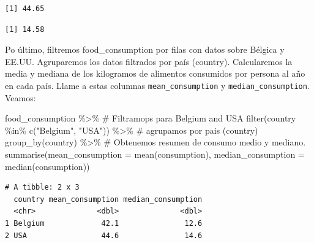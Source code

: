 \documentclass[
  letterpaper,
  DIV=11,
  numbers=noendperiod]{scrreprt}
\newenvironment{Shaded}{\begin{snugshade}}{\end{snugshade}}
\newcommand{\AttributeTok}[1]{\textcolor[rgb]{0.40,0.45,0.13}{#1}}
\newcommand{\CommentTok}[1]{\textcolor[rgb]{0.37,0.37,0.37}{#1}}
\newcommand{\FunctionTok}[1]{\textcolor[rgb]{0.28,0.35,0.67}{#1}}
\newcommand{\NormalTok}[1]{\textcolor[rgb]{0.00,0.23,0.31}{#1}}
\newcommand{\SpecialCharTok}[1]{\textcolor[rgb]{0.37,0.37,0.37}{#1}}
\newcommand{\StringTok}[1]{\textcolor[rgb]{0.13,0.47,0.30}{#1}}
\begin{document}
\begin{Shaded}
\end{Shaded}

\begin{verbatim}
[1] 44.65
\end{verbatim}

\begin{Shaded}
\end{Shaded}

\begin{verbatim}
[1] 14.58
\end{verbatim}

Po último, filtremos food\_consumption por filas con datos sobre Bélgica
y EE.UU. Agruparemos los datos filtrados por país (country).
Calcularemos la media y mediana de los kilogramos de alimentos
consumidos por persona al año en cada país. Llame a estas columnas
\texttt{mean\_consumption} y \texttt{median\_consumption}. Veamos:

\begin{Shaded}
\begin{Highlighting}[]
\NormalTok{food\_consumption }\SpecialCharTok{\%\textgreater{}\%}
  \CommentTok{\# Filtramops para Belgium and USA}
  \FunctionTok{filter}\NormalTok{(country }\SpecialCharTok{\%in\%} \FunctionTok{c}\NormalTok{(}\StringTok{"Belgium"}\NormalTok{, }\StringTok{"USA"}\NormalTok{)) }\SpecialCharTok{\%\textgreater{}\%}
  \CommentTok{\# agrupamos por pais (country)}
  \FunctionTok{group\_by}\NormalTok{(country) }\SpecialCharTok{\%\textgreater{}\%}
  \CommentTok{\# Obtenemos resumen de consumo medio y mediano.}
  \FunctionTok{summarise}\NormalTok{(}\AttributeTok{mean\_consumption =} \FunctionTok{mean}\NormalTok{(consumption),}
      \AttributeTok{median\_consumption =} \FunctionTok{median}\NormalTok{(consumption))}
\end{Highlighting}
\end{Shaded}

\begin{verbatim}
# A tibble: 2 x 3
  country mean_consumption median_consumption
  <chr>              <dbl>              <dbl>
1 Belgium             42.1               12.6
2 USA                 44.6               14.6
\end{verbatim}
\end{document}

